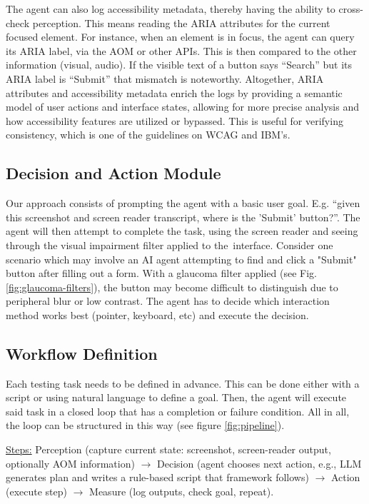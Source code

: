 
The agent can also log accessibility metadata, thereby having the ability to cross-check perception. This means reading the ARIA attributes for the current focused element. For instance, when an element is in focus, the agent can query its ARIA label, via the \ac{AOM} or other APIs. This is then compared to the other information (visual, audio). If the visible text of a button says “Search” but its ARIA label is “Submit” that mismatch is noteworthy. Altogether, ARIA attributes and accessibility metadata enrich the logs by providing a semantic model of user actions and interface states, allowing for more precise analysis and how accessibility features are utilized or bypassed. This is useful for verifying consistency, which is one of the guidelines on \ac{WCAG} and IBM's\cite{ibm2025accessibility}. 


\subsection{Decision and Action Module}


Our approach consists of prompting the agent with a basic user goal. E.g. “given this screenshot and screen reader transcript, where is the 'Submit' button?”. The agent will then attempt to complete the task, using the screen reader and seeing through the visual impairment filter applied to the~interface.
Consider one scenario which may involve an \ac{AI} agent attempting to find and click a "Submit" button after filling out a form. With a glaucoma filter applied (see Fig. \ref{fig:glaucoma-filters}), the button may become difficult to distinguish due to peripheral blur or low contrast. The agent has to decide which interaction method works best (pointer, keyboard, etc) and execute the decision.

\subsection{Workflow Definition}

Each testing task needs to be defined in advance. This can be done either with a script or using natural language to define a goal. Then, the agent will execute said task in a closed loop that has a completion or failure condition. All in all, the loop can be structured in this way (see figure \ref{fig:pipeline}).

\underline{Steps:} Perception (capture current state: screenshot, screen-reader output, optionally \ac{AOM} information) $\rightarrow$ Decision (agent chooses next action, e.g., LLM generates plan and writes a rule-based script that framework follows) $\rightarrow$ Action (execute step) $\rightarrow$ Measure (log outputs, check goal, repeat).


